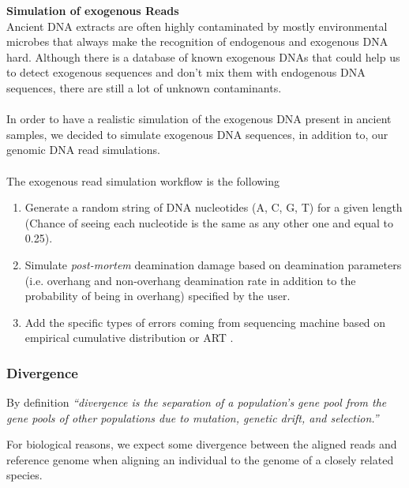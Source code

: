 \documentclass[11pt,a4paper]{report}
\newcommand{\quotes}[1]{``#1''}
\begin{document}
\textbf{Simulation of exogenous Reads }\\

Ancient DNA extracts are often highly contaminated by mostly environmental 
microbes that always make the recognition of endogenous and exogenous DNA 
hard. Although there is a database of known exogenous DNAs that could help 
us to detect exogenous sequences and don't mix them with endogenous DNA 
sequences, there are still a lot of unknown contaminants.
\\\\
In order to have a realistic simulation of the exogenous DNA present in ancient
samples, we decided to simulate exogenous DNA sequences, in addition to, our 
genomic DNA read simulations.
\\\\
The exogenous read simulation workflow is the following 

\begin{enumerate}

 \item Generate a random string of DNA nucleotides (A, C, G, T) 
 for a given length (Chance of seeing each nucleotide is the same as any
  other one and equal to 0.25).

\item Simulate \emph{post-mortem} deamination damage based on deamination
 parameters (i.e. overhang and non-overhang deamination rate in addition to 
 the probability of being in overhang) specified by the user. 

 \item Add the specific types of errors coming from sequencing machine 
 based on empirical cumulative distribution or ART\cite{art} .

\end{enumerate}





\subsubsection{Divergence} \label{Divergence}

By definition \emph{\quotes{divergence is the separation
of a population's gene pool from the gene pools of other populations 
due to mutation, genetic drift, and selection\cite{divergence1}.}}

For biological reasons, we expect some divergence between
the aligned reads and reference genome when aligning an individual 
to the genome of a closely related species.
\end{document}
